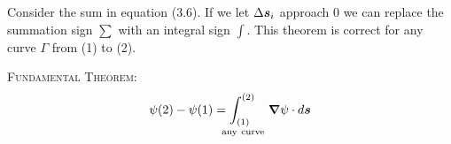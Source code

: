 Consider the sum in equation (3.6).
If we let $\Delta \boldsymbol{s}_i$ approach 0
we can replace the summation sign $\sum$ with an integral sign $\int$.
This theorem is correct for any curve $\Gamma$ from (1) to (2).

\vspace{2ex} \hspace{2em} \textsc{Fundamental Theorem:}
\begin{equation}
  \psi(2) - \psi(1) = \int
  _{\hspace{-3ex}\raisebox{-1ex}{\mbox{$\genfrac{}{}{0pt}{1}{(1)}{\mathrm{any\ curve}}$}}}
  ^{(2)} \grad \psi \cdot d\bv{s} 
\end{equation}


